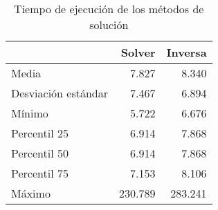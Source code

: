 \begin{table}[H]
 \centering
\caption{Tiempo de ejecución de los métodos de solución}
\label{tab:solver_inversa_gamma}
\begin{tabular}{l|r|r}
 & Solver & Inversa \\ \hline
Media & 7.827 & 8.340 \\ \hline
Desviación estándar & 7.467 & 6.894 \\ \hline
Mínimo & 5.722 & 6.676 \\ \hline
Percentil 25 & 6.914 & 7.868 \\ \hline
Percentil 50 & 6.914 & 7.868 \\ \hline
Percentil 75 & 7.153 & 8.106 \\ \hline
Máximo & 230.789 & 283.241
\end{tabular}
\end{table}
